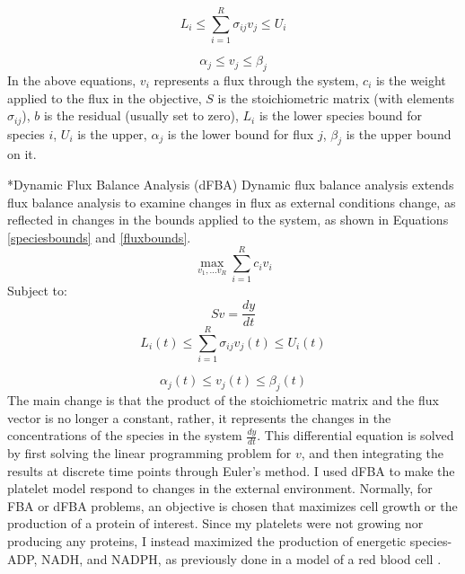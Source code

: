 \documentclass[11pt]{article}
\makeatletter
\renewcommand\subsection{\@startsection
	{subsection}{2}{0mm}
	{-0.05in}
	{-0.5\baselineskip}
	{\normalfont\normalsize\bfseries}}
\makeatother
\begin{document}
\begin{equation}
L_i  \leq \sum_{i=1}^R \sigma_{ij}v_j \leq U_i
\end{equation}

\begin{equation}
\alpha_j \leq v_j \leq \beta_j
\end{equation}
In the above equations, $v_i$ represents a flux through the system, $c_i$ is the weight applied to the flux in the objective, $S$ is the stoichiometric matrix (with elements $\sigma_{ij}$), $b$ is the residual (usually set to zero), $L_i$ is the lower species bound for species $i$, $U_i$ is the upper, $\alpha_j$ is the lower bound for flux $j$, $\beta_j$ is the upper bound on it.
\subsection*{Dynamic Flux Balance Analysis (dFBA)}
Dynamic flux balance analysis extends flux balance analysis to examine changes in flux as external conditions change, as reflected in changes in the bounds applied to the system, as shown in Equations \ref{speciesbounds} and \ref{fluxbounds}.  
\begin{equation}
\max_{v_1,...v_R}\sum_{i=1}^Rc_iv_i
\end{equation}
Subject to:
\begin{equation}
Sv=\frac{dy}{dt}
\end{equation}
\begin{equation}
\label{speciesbounds}
L_i(t)  \leq \sum_{i=1}^R \sigma_{ij}v_j(t) \leq U_i(t)
\end{equation}

\begin{equation}
\label{fluxbounds}
\alpha_j(t) \leq v_j(t) \leq \beta_j(t)
\end{equation}
The main change is that the product of the stoichiometric matrix and the flux vector is no longer a constant, rather, it represents the changes in the concentrations of the species in the system $\frac{dy}{dt}$. This differential equation is solved by first solving the linear programming problem for $v$, and then integrating the results at discrete time points through Euler's method. I used dFBA to make the platelet model respond to changes in the external environment. Normally, for FBA or dFBA problems, an objective is chosen that maximizes cell growth or the production of a protein of interest. Since my platelets were not growing nor producing any proteins, I instead maximized the production of energetic species-ADP, NADH, and NADPH, as previously done in a model of a red blood cell \cite{tekir2006analysis}.
\end{document}

